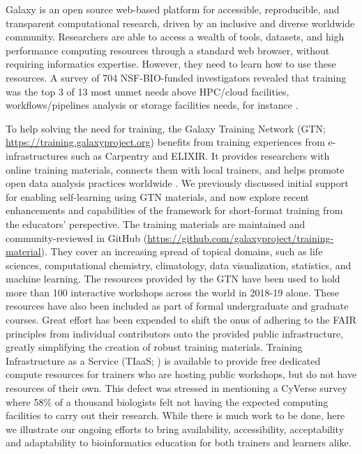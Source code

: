 \documentclass[10pt,letterpaper]{article}
\begin{document}
Galaxy \cite{Jalili2020} is an open source web-based platform for accessible, reproducible, and transparent computational research, driven by an inclusive and diverse worldwide community.
Researchers are able to access a wealth of tools, datasets, and high performance computing resources through a standard web browser, without requiring informatics expertise. However, they need to learn how to use these resources. A survey of 704 NSF-BIO-funded investigators revealed that training was the top 3 of 13 most unmet needs above HPC/cloud facilities, workflows/pipelines analysis or storage facilities needs, for instance \cite{Barone2017}.

To help solving the need for training, the Galaxy Training Network (GTN; \url{https://training.galaxyproject.org}) benefits from training experiences from e-infrastructures such as Carpentry and ELIXIR. It provides researchers with online training materials, connects them with local trainers, and helps promote open data analysis practices worldwide \cite{Batut2018}. We previously discussed initial support for enabling self-learning using GTN materials, and now explore recent enhancements and capabilities of the framework for short-format training from the educators’ perspective.
The training materials are maintained and community-reviewed in GitHub (\url{https://github.com/galaxyproject/training-material}). They cover an increasing spread of topical domains, such as life sciences, computational chemistry, climatology, data visualization, statistics, and machine learning. 
The resources provided by the GTN have been used to hold more than 100 interactive workshops across the world in 2018-19 alone.
These resources have also been included as part of formal undergraduate and graduate courses. Great effort has been expended to shift the onus of adhering to the FAIR principles \cite{Wilkinson2016} from individual contributors onto the provided public infrastructure, greatly simplifying the creation of robust training materials.
Training Infrastructure as a Service (TIaaS; \cite{Rasche2020}) is available to provide free dedicated compute resources for trainers who are hosting public workshops, but do not have resources of their own. This defect was stressed in \cite{Barone2017} mentioning a CyVerse survey where 58\% of a thousand biologists felt not having the expected computing facilities to carry out their research.
While there is much work to be done, here we illustrate our ongoing efforts to bring availability, accessibility, acceptability and adaptability to bioinformatics education for both trainers and learners alike.
\end{document}
